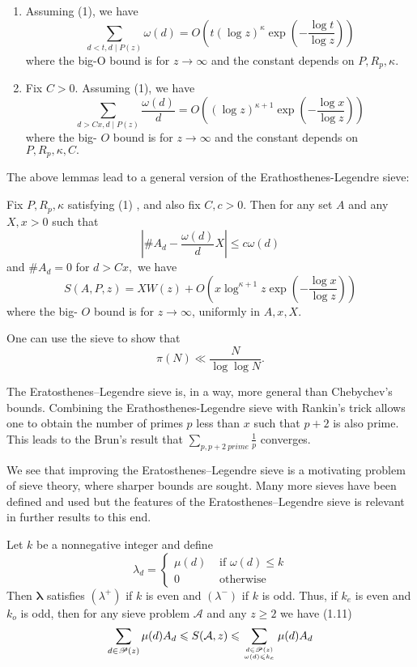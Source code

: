 \begin{lemma}
\begin{enumerate}
    \item Assuming (1), we have
$$
\sum_{d<t, d \mid P(z)} \omega(d)=O\left(t(\log z)^{\kappa} \exp \left(-\frac{\log t}{\log z}\right)\right)
$$
where the big-O bound is for $z \rightarrow \infty$ and the constant depends on $P, R_{p}, \kappa$.
    \item Fix $C>0 .$ Assuming (1), we have
$$
\sum_{d>C x, d \mid P(z)} \frac{\omega(d)}{d}=O\left((\log z)^{\kappa+1} \exp \left(-\frac{\log x}{\log z}\right)\right)
$$
where the big- $O$ bound is for $z \rightarrow \infty$ and the constant depends on $P, R_{p}, \kappa, C .$
\end{enumerate}
 
\end{lemma}

The above lemmas lead to a general version of the  Erathosthenes-Legendre sieve:

\begin{theorem}[]
Fix $P, R_{p}, \kappa$ satisfying (1) , and also fix $C, c>0$. Then for any set $A$ and any $X, x>0$ such that
$$
\left|\# A_{d}-\frac{\omega(d)}{d} X\right| \leq c \omega(d)
$$
and $\# A_{d}=0$ for $d>C x,$ we have
$$
S(A, P, z)=X W(z)+O\left(x \log ^{\kappa+1} z \exp \left(-\frac{\log x}{\log z}\right)\right)
$$
where the big- $O$ bound is for $z \rightarrow \infty$, uniformly in $A, x, X$.
\end{theorem}

One can use the sieve to show that 
$$
\pi(N) \ll \frac{N}{\log \log N}.
$$

The Eratosthenes–Legendre sieve is, in a way, more general than Chebychev’s bounds. Combining the Erathosthenes-Legendre sieve with Rankin's trick allows one to obtain the number of primes $p$ less than $x$ such that $p+2$ is also prime. This leads to the Brun's result that $\sum_{p,p+2\ prime}\frac{1}{p}$ converges.\cite{cojocarumurty}\cite{kedlaya}

We see that improving the Eratosthenes–Legendre sieve is a motivating problem of sieve theory, where sharper bounds are sought. Many more sieves have been defined and used but the features of the Eratosthenes–Legendre sieve is relevant in further results to this end.




\begin{theorem}
Let $k$ be a nonnegative integer and define
$$
\lambda_{d}=\left\{\begin{array}{ll}
\mu(d) & \text { if } \omega(d) \leqslant k \\
0 & \text { otherwise }
\end{array}\right.
$$
Then $\boldsymbol{\lambda}$ satisfies $\left(\lambda^{+}\right)$ if $k$ is even and $\left(\lambda^{-}\right)$ if $k$ is odd. Thus, if $k_{e}$ is even and $k_{o}$ is odd, then for any sieve
problem $\mathcal{A}$ and any $z \geqslant 2$ we have
(1.11)
$$
\sum_{d \in \mathscr{P}(z)} \mu(d) A_{d} \leqslant S(\mathcal{A}, z) \leqslant \sum_{d \in \mathscr{P}(z) \atop \omega(d) \leqslant k_{e}} \mu(d) A_{d}
$$
\end{theorem}